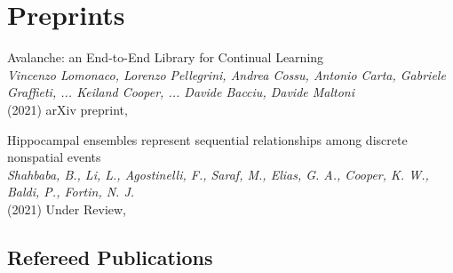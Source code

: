 \documentclass[10pt]{cooperCV2}
\begin{document}
 



\section{Preprints} 
\begin{etaremune}[ itemindent=-\bibhang, topsep=0pt,
				   itemsep=\bibsep,partopsep=0pt,parsep=0pt,leftmargin={\bibhang+\widthof{[999]}}] 
    
    \item Avalanche: an End-to-End Library for Continual Learning \\
     \textit{Vincenzo Lomonaco, Lorenzo Pellegrini, Andrea Cossu, Antonio Carta, Gabriele Graffieti, ... Keiland Cooper, ... Davide Bacciu, Davide Maltoni}\\
     (2021) arXiv preprint, 
     
	
    \item Hippocampal ensembles represent sequential relationships among discrete nonspatial events \\
     \textit{Shahbaba, B., Li, L., Agostinelli, F., Saraf, M., Elias, G. A., Cooper, K. W., Baldi, P.,  Fortin, N. J.}\\
     (2021) Under Review, 
     
	


\end{etaremune}









 






\vspace{0.1in}
\subsection{Refereed Publications}
\end{document}
